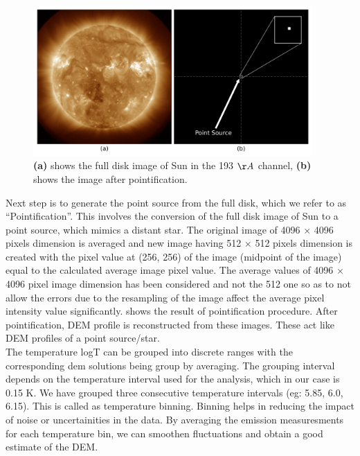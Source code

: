 \begin{figure}[h!]
    \centering
    \includegraphics[width=0.95\textwidth]{images/ps_plus_full_disk.png}
    \caption[Full disk and pointified image of Sun]{\textbf{(a)} shows the full disk image of Sun in the 193 $\AA$ channel, \textbf{(b)} shows the image after pointification.}
    \label{fig:ps_plus_full_disk}
\end{figure}

Next step is to generate the point source from the full disk, which we refer to as ``Pointification''. This involves the conversion of the full disk image of Sun to a point source, which mimics a distant star. The original image of 4096 $\times$ 4096 pixels dimension is averaged and new image having 512 $\times$ 512 pixels dimension is created with the pixel value at (256, 256) of the image (midpoint of the image) equal to the calculated average image pixel value. The average values of 4096 $\times$ 4096 pixel image dimension has been considered and not the 512 one so as to not allow the errors due to the resampling of the image affect the average pixel intensity value significantly.  shows the result of pointification procedure. After pointification, DEM profile is reconstructed from these images. These act like DEM profiles of a point source/star.\\

The temperature logT can be grouped into discrete ranges with the corresponding dem solutions being group by averaging. The grouping interval depends on the temperature interval used for the analysis, which in our case is 0.15 K. We have grouped three consecutive temperature intervals (eg: 5.85, 6.0, 6.15). This is called as temperature binning. Binning helps in reducing the impact of noise or uncertainities in the data. By averaging the emission measuresments for each temperature bin, we can smoothen fluctuations and obtain a good estimate of the DEM.

